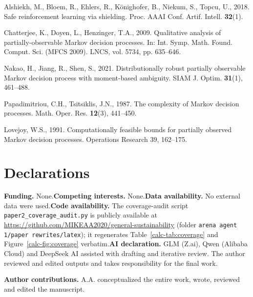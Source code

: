 \documentclass[10pt,twocolumn]{article}
\theoremstyle{definition}
\begin{document}
{Alshiekh, M., Bloem, R., Ehlers, R., K\"{o}nighofer, B., Niekum, S.,
Topcu, U., 2018. Safe reinforcement learning via shielding. Proc. AAAI
Conf. Artif. Intell. \textbf{32}(1).

Chatterjee, K., Doyen, L., Henzinger, T.A., 2009. Qualitative analysis
of partially-observable Markov decision processes. In: Int. Symp. Math.
Found. Comput. Sci. (MFCS 2009). LNCS, vol. 5734, pp. 635--646.

Nakao, H., Jiang, R., Shen, S., 2021. Distributionally robust partially
observable Markov decision process with moment-based ambiguity. SIAM J.
Optim. \textbf{31}(1), 461--488.

Papadimitriou, C.H., Tsitsiklis, J.N., 1987. The complexity of Markov
decision processes. Math. Oper. Res. \textbf{12}(3), 441--450.

Lovejoy, W.S., 1991. Computationally feasible bounds for partially
observed Markov decision processes. Operations Research 39, 162--175.
}

\section*{Declarations}

\textbf{Funding.} None.\quad \textbf{Competing interests.} None.\quad \textbf{Data availability.} No external data were used.\quad \textbf{Code availability.} The coverage-audit script \texttt{paper2\_coverage\_audit.py} is publicly available at \url{https://github.com/MIKEAA2020/general-sustainability} (folder \texttt{arena agent 1/paper rewrites/latex}); it regenerates Table~\ref{calc-tab:coverage} and Figure~\ref{calc-fig:coverage} verbatim.\quad \textbf{AI declaration.} GLM (Z.ai), Qwen (Alibaba Cloud) and DeepSeek AI assisted with drafting and iterative review. The author reviewed and edited outputs and takes
responsibility for the final work.

\textbf{Author contributions.} A.A. conceptualized the entire work, wrote, reviewed and edited the manuscript.
\end{document}
